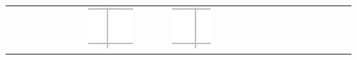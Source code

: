 \documentclass[10pt]{article}
\begin{document}
\begin{center}
\begin{tabular}{|c|c|c|c|c|c|c|c|c|c|c|c|c|c|c|c|c|c|c|c|c|c|c|c|c|c|c|}
 &  &  &  &  &  &  &  & \includegraphics[max width=\textwidth]{2024_11_21_d51d653f4fe4a5bb0c33g-15(4)}
 &  &  &  & \includegraphics[max width=\textwidth]{2024_11_21_d51d653f4fe4a5bb0c33g-15(3)}

\end{tabular}
\end{center}
\end{document}
